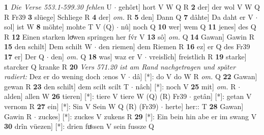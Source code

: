 \documentclass[8pt,a4paper,notitlepage]{article}
\begin{document}
\begin{table}[ht]
\begin{minipage}[t]{0.5\linewidth}
\textbf{1} \textit{Die Verse 553.1-599.30 fehlen} U   $\cdot$ gehôrt] hort V W Q R \textbf{2} der] der wol V W Q R Fr39 \textbf{3} slüege] Schliege R \textbf{4} der] \textit{om.} R \textbf{5} den] Dann Q \textbf{7} dâhte] Da daht er V  $\cdot$ sol] ist W \textbf{8} möhte] mohte T V (Q)  $\cdot$ nû] noch Q \textbf{10} wer] wem Q \textbf{11} jenes] des Q R \textbf{12} Einen starken loͤwen springen her fv́r V \textbf{13} sô] \textit{om.} Q \textbf{14} Gawan] Gawin R \textbf{15} den schilt] Dem schilt W  $\cdot$ den riemen] dem Riemen R \textbf{16} ez] er Q des Fr39 \textbf{17} er] Der Q  $\cdot$ den] \textit{om.} Q \textbf{18} was] waz er V  $\cdot$ vreislîch] freistlich R \textbf{19} starke] starcker Q kranke R \textbf{20} \textit{Vers 571.20 ist am Rand nachgetragen und später radiert:} Dez er do wening doch :enos V   $\cdot$ dâ] [*]: do V do W R \textit{om.} Q \textbf{22} Gawan] gewan R \textbf{23} den schilt] dem scilt scilt T  $\cdot$ nâch] [*]: noch V \textbf{25} mit] \textit{om.} R  $\cdot$ alden] allen W \textbf{26} tieren] [*]: tiere V tiere W (Q) (R) Fr39  $\cdot$ getân] [*]: getan V vernom R \textbf{27} ein] [*]: Sin V Sein W Q (R) (Fr39)  $\cdot$ herte] her:: T \textbf{28} Gawan] Gawin R  $\cdot$ zuckes] [*]: zuckes V zukens R \textbf{29} [*]: Ein bein hin abe er im swang V \textbf{30} drîn vüezen] [*]: drien fuͤssen V sein fussze Q \newline
\end{minipage}
\end{table}
\end{document}
